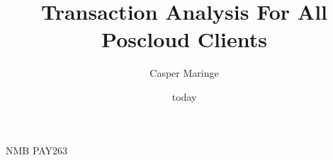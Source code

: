 \documentclass[12pt,a4paper,oneside,draft]{report}
\title{Transaction Analysis For All Poscloud Clients}
\author{Casper Maringe}
\date{today}
\begin{document}
\maketitle

NMB PAY263
\end{document}
